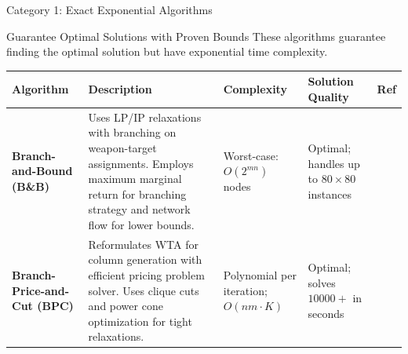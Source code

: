 \documentclass[aspectratio=43,8pt]{beamer}
\begin{document}
\begin{frame}{Category 1: Exact Exponential Algorithms}
\begin{block}{Guarantee Optimal Solutions with Proven Bounds}
These algorithms guarantee finding the optimal solution but have exponential time complexity.
\end{block}

\vspace{0.2cm}
\begin{table}[h]
\centering
\small
\begin{tabular}{p{1.8cm}p{3.8cm}p{1.6cm}p{1.7cm}p{0.6cm}}
\toprule
\textbf{Algorithm} & \textbf{Description} & \textbf{Complexity} & \textbf{Solution Quality} & \textbf{Ref} \\
\midrule
\textbf{Branch-and-Bound (B\&B)} & Uses LP/IP relaxations with branching on weapon-target assignments. Employs maximum marginal return for branching strategy and network flow for lower bounds. & Worst-case: $O(2^{mn})$ nodes & \textcolor{accentgreen}{Optimal}; handles up to $80 \times 80$ instances & \cite{ahuja2007} \\
\addlinespace
\textbf{Branch-Price-and-Cut (BPC)} & Reformulates WTA for column generation with efficient pricing problem solver. Uses clique cuts and power cone optimization for tight relaxations. & Polynomial per iteration; $O(nm \cdot K)$ & \textcolor{accentgreen}{Optimal}; solves $10000+$ in seconds & \cite{bertsimas2025} \\
\bottomrule
\end{tabular}
\end{table}
\end{frame}
\end{document}
